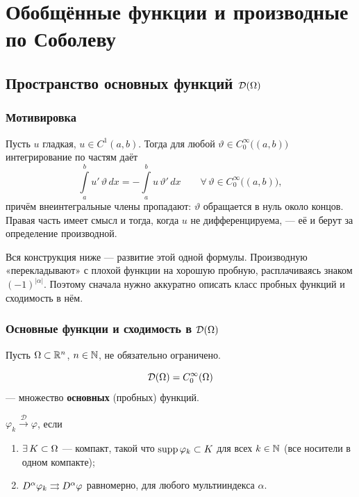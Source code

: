 \section{Обобщённые функции и производные по Соболеву}

\subsection{Пространство основных функций $\mathcal{D}(\Omega)$}

\subsubsection*{Мотивировка}

Пусть $u$ гладкая, $u \in C^1(a,b)$. Тогда для любой $\vartheta \in C_0^\infty\big((a,b)\big)$
интегрирование по частям даёт
\[
  \int\limits_a^b u'\,\vartheta\, dx = -\int\limits_a^b u\,\vartheta'\, dx
  \qquad \forall\, \vartheta \in C_0^\infty\big((a,b)\big) ,
\]
причём внеинтегральные члены пропадают: $\vartheta$ обращается в нуль около концов.
Правая часть имеет смысл и тогда, когда $u$ не дифференцируема, — её и берут
за определение производной.

\begin{idea}
Вся конструкция ниже — развитие этой одной формулы. Производную «перекладывают»
с плохой функции на хорошую пробную, расплачиваясь знаком $(-1)^{|\alpha|}$.
Поэтому сначала нужно аккуратно описать класс пробных функций и сходимость в нём.
\end{idea}

\subsubsection*{Основные функции и сходимость в $\mathcal{D}(\Omega)$}

Пусть $\Omega \subset \mathbb{R}^n$, $n \in \mathbb{N}$, не обязательно ограничено.

\begin{definition}
\[
  \mathcal{D}(\Omega) = C_0^\infty(\Omega)
\]
— множество \textbf{основных} (пробных) функций.
\end{definition}

\begin{definition}
$\varphi_k \xrightarrow{\ \mathcal{D}\ } \varphi$, если
\begin{enumerate}
  \item $\exists\, K \subset \Omega$ — компакт, такой что $\operatorname{supp} \varphi_k \subset K$
        для всех $k \in \mathbb{N}$ (все носители в одном компакте);
  \item $D^\alpha \varphi_k \rightrightarrows D^\alpha \varphi$ равномерно, для любого мультииндекса
        $\alpha$.
\end{enumerate}
\end{definition}

